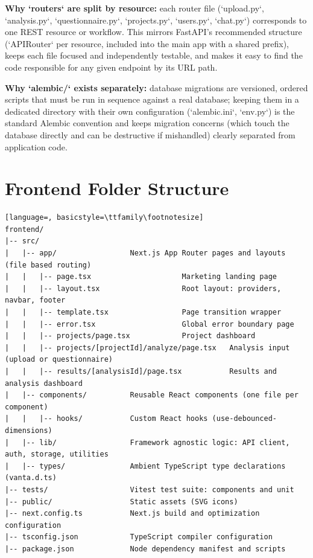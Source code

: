 \documentclass[11pt,a4paper]{report}
\begin{document}
\textbf{Why `routers` are split by resource:} each router file (`upload.py`, `analysis.py`, `questionnaire.py`, `projects.py`, `users.py`, `chat.py`) corresponds to one REST resource or workflow. This mirrors FastAPI's recommended structure (`APIRouter` per resource, included into the main app with a shared prefix), keeps each file focused and independently testable, and makes it easy to find the code responsible for any given endpoint by its URL path.

\textbf{Why `alembic/` exists separately:} database migrations are versioned, ordered scripts that must be run in sequence against a real database; keeping them in a dedicated directory with their own configuration (`alembic.ini`, `env.py`) is the standard Alembic convention and keeps migration concerns (which touch the database directly and can be destructive if mishandled) clearly separated from application code.

\section{Frontend Folder Structure}

\begin{lstlisting}[language=, basicstyle=\ttfamily\footnotesize]
frontend/
|-- src/
|   |-- app/                 Next.js App Router pages and layouts (file based routing)
|   |   |-- page.tsx                     Marketing landing page
|   |   |-- layout.tsx                   Root layout: providers, navbar, footer
|   |   |-- template.tsx                 Page transition wrapper
|   |   |-- error.tsx                    Global error boundary page
|   |   |-- projects/page.tsx            Project dashboard
|   |   |-- projects/[projectId]/analyze/page.tsx   Analysis input (upload or questionnaire)
|   |   |-- results/[analysisId]/page.tsx           Results and analysis dashboard
|   |-- components/          Reusable React components (one file per component)
|   |   |-- hooks/           Custom React hooks (use-debounced-dimensions)
|   |-- lib/                 Framework agnostic logic: API client, auth, storage, utilities
|   |-- types/               Ambient TypeScript type declarations (vanta.d.ts)
|-- tests/                   Vitest test suite: components and unit
|-- public/                  Static assets (SVG icons)
|-- next.config.ts           Next.js build and optimization configuration
|-- tsconfig.json            TypeScript compiler configuration
|-- package.json             Node dependency manifest and scripts
\end{lstlisting}
\end{document}
